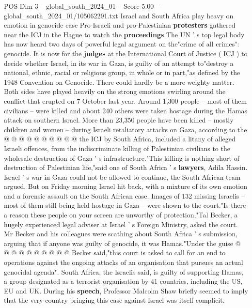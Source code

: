 \begin{textsample}{POS Dim 3 – global\_south\_2024\_01 – Score 5.00 – global\_south\_2024\_01/105062291.txt}  \label{ex:f3_pos_357}
Israel and South Africa play heavy on emotion in genocide case Pro-Israeli and pro-Palestinian \textbf{protesters} gathered near the ICJ in the Hague to watch the \textbf{proceedings} The UN ' s top legal body has now heard two days of powerful legal argument on the"crime of all crimes": genocide.
It is now for the \textbf{judges} at the International Court of Justice ( ICJ ) to decide whether Israel, in its war in Gaza, is guilty of an attempt to"destroy a national, ethnic, racial or religious group, in whole or in part,"as defined by the 1948 Convention on Genocide.
There could hardly be a more weighty matter.
Both sides have played heavily on the strong emotions swirling around the conflict that erupted on 7 October last year.
Around 1,300 people -- most of them civilians -- were killed and about 240 others were taken hostage during the Hamas attack on southern Israel.
More than 23,350 people have been killed -- mostly children and women -- during Israeli retaliatory attacks on Gaza, according to the @ @ @ @ @ @ @ @ @ @ the ICJ by South Africa, included a litany of alleged Israeli offences, from the indiscriminate killing of Palestinian civilians to the wholesale destruction of Gaza ' s infrastructure."This killing is nothing short of destruction of Palestinian life,"said one of South Africa ' s \textbf{lawyers}, Adila Hassin.
Israel ' s war in Gaza could not be allowed to continue, the South African team argued.
But on Friday morning Israel hit back, with a mixture of its own emotion and a forensic assault on the South African case.
Images of 132 missing Israelis -- most of them still being held hostage in Gaza -- were shown to the court."Is there a reason these people on your screen are unworthy of protection,"Tal Becker, a hugely experienced legal adviser at Israel ' s Foreign Ministry, asked the court.
Mr Becker and his colleagues were scathing about South Africa ' s submission, arguing that if anyone was guilty of genocide, it was Hamas."Under the guise @ @ @ @ @ @ @ @ @ @ Becker said,"this court is asked to call for an end to operations against the ongoing attacks of an organisation that pursues an actual genocidal agenda".
South Africa, the Israelis said, is guilty of supporting Hamas, a group designated as a terrorist organisation by 41 countries, including the US, EU and UK.
During his \textbf{speech}, Professor Malcolm Shaw briefly seemed to imply that the very country bringing this case against Israel was itself complicit.

\end{textsample}
